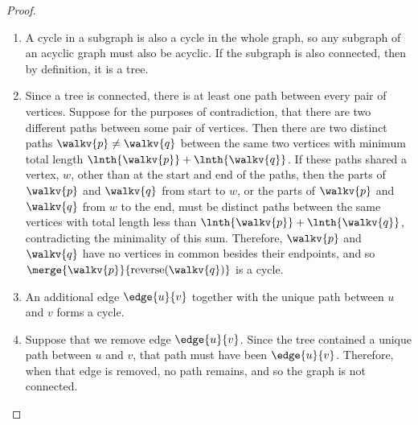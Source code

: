 \begin{proof}
\begin{enumerate}

\item A cycle in a subgraph is also a cycle in the whole graph, so any
  subgraph of an acyclic graph must also be acyclic.  If the subgraph
  is also connected, then by definition, it is a tree.

\item Since a tree is connected, there is at least one path between
  every pair of vertices.  Suppose for the purposes of contradiction,
  that there are two different paths between some pair of vertices.
  Then there are two distinct paths $\walkv{p} \neq \walkv{q}$ between
  the same two vertices with minimum total length $\lnth{\walkv{p}}+
  \lnth{\walkv{q}}$.  If these paths shared a vertex, $w$,
  other than at the start and end of the paths, then the parts of
  $\walkv{p}$ and $\walkv{q}$ from start to $w$, or the parts of
  $\walkv{p}$ and $\walkv{q}$ from $w$ to the end, must be
    distinct paths between the same vertices with total length less than
   $\lnth{\walkv{p}}+ \lnth{\walkv{q}}$, contradicting the minimality
    of this sum.  Therefore,  $\walkv{p}$ and $\walkv{q}$ have no
        vertices in common besides their endpoints, and so
        $\merge{\walkv{p}}{\text{reverse}(\walkv{q})}$ is a cycle.

\iffalse
  Beginning at $u$, let $x$ be the first vertex where
  the paths diverge, and let $y$ be the next vertex they share.  (For
  example, see Figure~\ref{fig:5L}.)  Then there are two paths from
  $x$ to~$y$ with no common edges, which defines a cycle.  This is a
  contradiction, since trees are acyclic.  Therefore, there is
  exactly one path between every pair of vertices.

\begin{figure}

\graphic{unique-path}

\caption{If there are two paths between $u$ and~$v$, the graph must
  contain a cycle.}

\label{fig:5L}
\end{figure}
\fi

\item An additional edge $\edge{u}{v}$ together with the unique path
  between $u$ and $v$ forms a cycle.

\item Suppose that we remove edge $\edge{u}{v}$.  Since the tree
  contained a unique path between $u$ and $v$, that path must have
  been $\edge{u}{v}$.  Therefore, when that edge is removed, no path
  remains, and so the graph is not connected.


\end{enumerate}
\end{proof}
